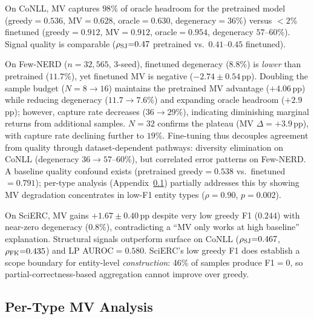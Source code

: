 On CoNLL, MV captures $98$\% of oracle headroom for the pretrained model (greedy${=}0.536$, MV${=}0.628$, oracle${=}0.630$, degeneracy${=}36$\%) versus ${<}2$\% finetuned (greedy${=}0.912$, MV${=}0.912$, oracle${=}0.954$, degeneracy $57$--$60$\%).
Signal quality is comparable ($\rho_{\textup{SJ}}{=}0.47$ pretrained vs.\ $0.41$--$0.45$ finetuned).

On Few-NERD ($n{=}32{,}565$, 3-seed), finetuned degeneracy ($8.8$\%) is \textit{lower} than pretrained ($11.7$\%), yet finetuned MV is negative ($-2.74{\pm}0.54$\,pp).
Doubling the sample budget ($N{=}8{\to}16$) maintains the pretrained MV advantage ($+4.06$\,pp) while reducing degeneracy ($11.7{\to}7.6$\%) and expanding oracle headroom ($+2.9$\,pp); however, capture rate decreases ($36{\to}29$\%), indicating diminishing marginal returns from additional samples.
$N{=}32$ confirms the plateau (MV $\Delta{=}+3.9$\,pp), with capture rate declining further to $19$\%.
Fine-tuning thus decouples agreement from quality through dataset-dependent pathways: diversity elimination on CoNLL (degeneracy $36{\to}57$--$60$\%), but correlated error patterns on Few-NERD.
A baseline quality confound exists (pretrained greedy${=}0.538$ vs.\ finetuned${=}0.791$); per-type analysis (Appendix~\ref{app:pertype}) partially addresses this by showing MV degradation concentrates in low-F1 entity types ($\rho{=}0.90$, $p{=}0.002$).

On SciERC, MV gains $+1.67{\pm}0.40$\,pp despite very low greedy F1 ($0.244$) with near-zero degeneracy ($0.8$\%), contradicting a ``MV only works at high baseline'' explanation.
Structural signals outperform surface on CoNLL ($\rho_{\textup{SJ}}{=}0.467$, $\rho_{\textup{FK}}{=}0.435$) and LP AUROC${=}0.580$.
SciERC's low greedy F1 does establish a scope boundary for entity-level \textit{construction}: 46\% of samples produce F1${=}0$, so partial-correctness-based aggregation cannot improve over greedy.

\subsection{Per-Type MV Analysis}\label{app:pertype}

